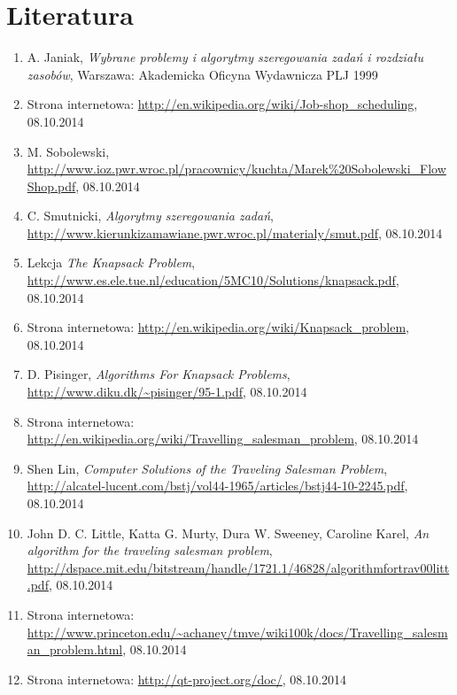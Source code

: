 \documentclass[eng,printmode]{mgr}
\begin{document}
\newpage
\renewcommand{\thechapter}{}
\renewcommand{\chaptername}{}
\chapter{Literatura}
\begin{enumerate}

\item {A. Janiak, \emph{Wybrane problemy i algorytmy szeregowania  zadań i rozdziału zasobów}, Warszawa: Akademicka Oficyna Wydawnicza PLJ 1999}

\item {Strona internetowa: \url{http://en.wikipedia.org/wiki/Job-shop_scheduling}, 08.10.2014}

\item {M. Sobolewski, \url{http://www.ioz.pwr.wroc.pl/pracownicy/kuchta/Marek%20Sobolewski_FlowShop.pdf}, 08.10.2014}

\item {C. Smutnicki, \emph{Algorytmy szeregowania zadań}, \url{http://www.kierunkizamawiane.pwr.wroc.pl/materialy/smut.pdf}, 08.10.2014}

\item {Lekcja \emph{The Knapsack Problem}, \url{http://www.es.ele.tue.nl/education/5MC10/Solutions/knapsack.pdf}, 08.10.2014}

\item {Strona internetowa: \url{http://en.wikipedia.org/wiki/Knapsack_problem}, 08.10.2014}

\item {D. Pisinger, \emph{Algorithms For Knapsack Problems}, \url{http://www.diku.dk/~pisinger/95-1.pdf}, 08.10.2014}

\item {Strona internetowa: \url{http://en.wikipedia.org/wiki/Travelling_salesman_problem}, 08.10.2014}

\item {Shen Lin, \emph{Computer Solutions of the Traveling Salesman Problem}, \url{http://alcatel-lucent.com/bstj/vol44-1965/articles/bstj44-10-2245.pdf}, 08.10.2014}

\item {John D. C. Little, Katta G. Murty, Dura W. Sweeney, Caroline Karel, \emph{An algorithm for the traveling salesman problem}, \url{http://dspace.mit.edu/bitstream/handle/1721.1/46828/algorithmfortrav00litt.pdf}, 08.10.2014}

\item {Strona internetowa: \url{http://www.princeton.edu/~achaney/tmve/wiki100k/docs/Travelling_salesman_problem.html}, 08.10.2014}

\item {Strona internetowa: \url{http://qt-project.org/doc/}, 08.10.2014}

\end{enumerate}
\end{document}
